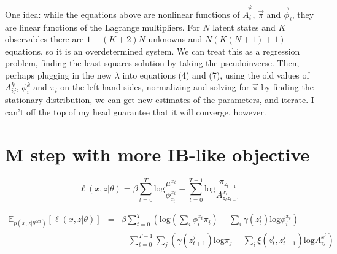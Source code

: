 \documentclass[11pt]{article}
\begin{document}
One idea: while the equations above are nonlinear functions of $\vec{A}^k_i$, $\vec{\pi}$ and $\vec{\phi}_i$, they are linear functions of the Lagrange multipliers.  For $N$ latent states and $K$ observables there are $1 + (K + 2)N$ unknowns and $N(K(N+1) + 1)$ equations, so it is an overdetermined system.  We can treat this as a regression problem, finding the least squares solution by taking the pseudoinverse.  Then, perhaps plugging in the new $\lambda$ into equations (4) and (7), using the old values of $A^k_{ij}$, $\phi^k_i$ and $\pi_i$ on the left-hand sides, normalizing and solving for $\vec{\pi}$ by finding the stationary distribution, we can get new estimates of the parameters, and iterate.  I can't off the top of my head guarantee that it will converge, however.





\section{M step with more IB-like objective}

\[
\ell(x,z|\theta) = \beta \sum_{t=0}^T \mathrm{log}\frac{\mu^{x_t}}{\phi^{x_t}_{z_t}} - \sum_{t=0}^{T-1} \mathrm{log}\frac{\pi_{z_{t+1}}}{A^{x_t}_{z_t z_{t+1}}}
\]

\begin{eqnarray*}
\mathbb{E}_{p(x,z|\theta^{old})}[\ell(x,z|\theta)] & = & \beta\sum_{t=0}^T \left(\mathrm{log}(\sum_i \phi_i^{x_t}\pi_i) - \sum_i \gamma(z_t^i) \mathrm{log}\phi_{i}^{x_t}\right) \\
& & - \sum_{t=0}^{T-1}\sum_j \left(\gamma(z_{t+1}^j)\mathrm{log}\pi_j - \sum_i \xi(z_{t}^i,z_{t+1}^j)\mathrm{log}A^{x^t}_{ij}\right)
\end{eqnarray*}
\end{document}
